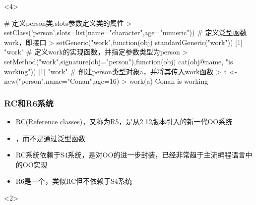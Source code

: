 \begin{frame}[c,fragile]{\subsecname}{\subsubsecname}
\begin{overlayarea}{\textwidth}{\textheight}
\begin{onlyenv}<4>
\begin{rcode}
# 定义person类,slots参数定义类的属性
> setClass('person',slots=list(name="character",age="numeric"))
# 定义泛型函数work，即接口
> setGeneric("work",function(obj) standardGeneric("work"))
[1] "work"
# 定义work的实现函数，并指定参数类型为person
> setMethod("work",signature(obj="person"),function(obj) cat(obj@name, "is working"))
[1] "work"
# 创建person类型对象a，并将其传入work函数
> a <- new("person",name="Conan",age=16)
> work(a)
Conan is working
\end{rcode}  
\end{onlyenv}
\end{overlayarea}
\end{frame}

\subsubsection{RC和R6系统}
\begin{frame}[t,fragile]{\subsecname}{\subsubsecname}
  \begin{itemize}
  \item<1-> RC(Reference classes)，又称为R5，是从2.12版本引入的新一代OO系统
  \item<2-> ，而不是通过泛型函数
  \item<2-> RC系统依赖于S4系统，是对OO的进一步封装，已经非常趋于主流编程语言中的OO实现
  \item<3-> R6是一个，类似RC但不依赖于S4系统 
  \end{itemize}  

\begin{overlayarea}{\textwidth}{\textheight}
\begin{onlyenv}<2>
\end{onlyenv}
\end{overlayarea}
\end{frame}